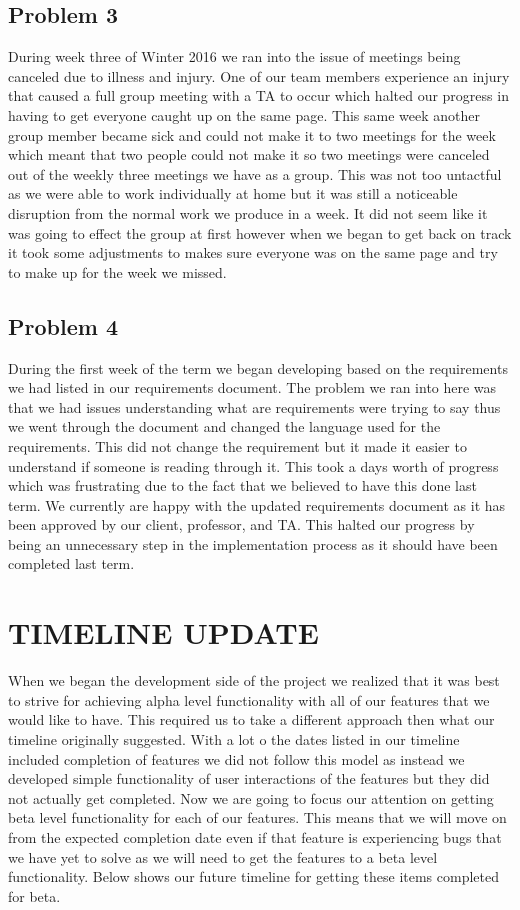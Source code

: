\documentclass[letterpaper,10pt,onecolumn]{IEEEtran} %
\begin{document}
\subsection{Problem 3}
During week three of Winter 2016 we ran into the issue of meetings being canceled due to illness and injury. One of our team members experience an injury that caused a full group meeting with a TA to occur which halted our progress in having to get everyone caught up on the same page. This same week another group member became sick and could not make it to two meetings for the week which meant that two people could not make it so two meetings were canceled out of the weekly three meetings we have as a group. This was not too untactful as we were able to work individually at home but it was still a noticeable disruption from the normal work we produce in a week. It did not seem like it was going to effect the group at first however when we began to get back on track it took some adjustments to makes sure everyone was on the same page and try to make up for the week we missed.

\subsection{Problem 4}
During the first week of the term we began developing based on the requirements we had listed in our requirements document. The problem we ran into here was that we had issues understanding what are requirements were trying to say thus we went through the document and changed the language used for the requirements. This did not change the requirement but it made it easier to understand if someone is reading through it. This took a days worth of progress which was frustrating due to the fact that we believed to have this done last term. We currently are happy with the updated requirements document as it has been approved by our client, professor, and TA. This halted our progress by being an unnecessary step in the implementation process as it should have been completed last term.

\section{TIMELINE UPDATE}
When we began the development side of the project we realized that it was best to strive for achieving alpha level functionality with all of our features that we would like to have. This required us to take a different approach then what our timeline originally suggested. With a lot o the dates listed in our timeline included completion of features we did not follow this model as instead we developed simple functionality of user interactions of the features but they did not actually get completed.
Now we are going to focus our attention on getting beta level functionality for each of our features. This means that we will move on from the expected completion date even if that feature is experiencing bugs that we have yet to solve as we will need to get the features to a beta level functionality. Below shows our future timeline for getting these items completed for beta.
\end{document}
